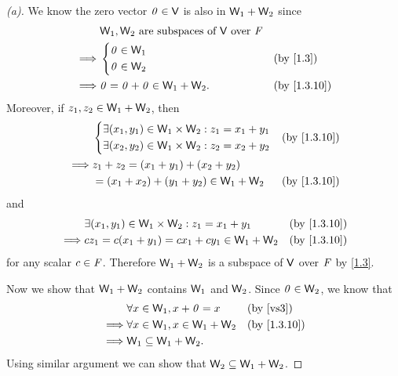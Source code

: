 \begin{proof}[(a)]
  We know the zero vector \(\mathit{0} \in \mathsf{V}\) is also in \(\mathsf{W}_1 + \mathsf{W}_2\) since
  \begin{align*}
             & \W_1, \W_2 \text{ are subspaces of } \V \text{ over } \F                  \\
    \implies & \begin{dcases}
                 \zv \in \W_1 \\
                 \zv \in \W_2
               \end{dcases}                                          &  & \by{1.3}       \\
    \implies & \zv = \zv + \zv \in \W_1 + \W_2.                         &  & \by{1.3.10}
  \end{align*}
  Moreover, if \(z_1, z_2 \in \mathsf{W}_1 + \mathsf{W}_2\), then
  \begin{align*}
             & \begin{dcases}
                 \exists (x_1, y_1) \in \W_1 \times \W_2 : z_1 = x_1 + y_1 \\
                 \exists (x_2, y_2) \in \W_1 \times \W_2 : z_2 = x_2 + y_2
               \end{dcases} &  & \by{1.3.10}                     \\
    \implies & z_1 + z_2 = (x_1 + y_1) + (x_2 + y_2)                                         \\
             & = (x_1 + x_2) + (y_1 + y_2) \in \W_1 + \W_2                  &  & \by{1.3.10}
  \end{align*}
  and
  \begin{align*}
             & \exists (x_1, y_1) \in \W_1 \times \W_2 : z_1 = x_1 + y_1 &  & \by{1.3.10} \\
    \implies & cz_1 = c(x_1 + y_1) = cx_1 + cy_1 \in \W_1 + \W_2         &  & \by{1.3.10}
  \end{align*}
  for any scalar \(c \in \mathit{F}\).
  Therefore \(\mathsf{W}_1 + \mathsf{W}_2\) is a subspace of \(\mathsf{V}\) over \(\mathit{F}\) by \cref{1.3}.

  Now we show that \(\mathsf{W}_1 + \mathsf{W}_2\) contains \(\mathsf{W}_1\) and \(\mathsf{W}_2\).
  Since \(\mathit{0} \in \mathsf{W}_2\), we know that
  \begin{align*}
             & \forall x \in \W_1, x + \zv = x       &  & \text{(by \ref{vs3})} \\
    \implies & \forall x \in \W_1, x \in \W_1 + \W_2 &  & \by{1.3.10}           \\
    \implies & \W_1 \subseteq \W_1 + \W_2.
  \end{align*}
  Using similar argument we can show that \(\mathsf{W}_2 \subseteq \mathsf{W}_1 + \mathsf{W}_2\).
\end{proof}

